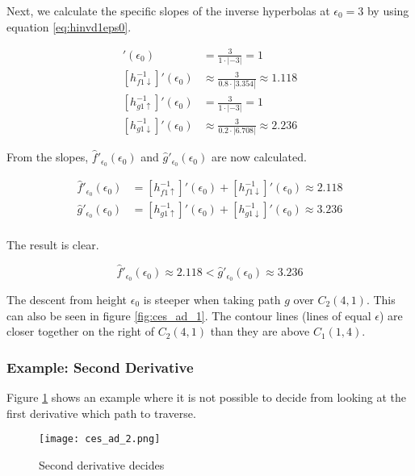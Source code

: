 Next, we calculate the specific slopes of the inverse hyperbolas at $\epsilon_0 = 3$ by using equation \ref{eq:hinvd1eps0}.

\begin{align*}
	[h_{f1\uparrow}^{-1}]'(\epsilon_0) &= \frac{3}{1\cdot\left|-3\right|} = 1\\
	[h_{f1\downarrow}^{-1}]'(\epsilon_0) &\approx \frac{3}{0.8\cdot\left|3.354\right|} \approx 1.118\\
	[h_{g1\uparrow}^{-1}]'(\epsilon_0) &= \frac{3}{1\cdot\left|-3\right|} = 1\\
	[h_{g1\downarrow}^{-1}]'(\epsilon_0) &\approx \frac{3}{0.2\cdot\left|6.708\right|} \approx 2.236 
\end{align*}

From the slopes, $\hat{f}'_{\epsilon_0}(\epsilon_0)$ and $\hat{g}'_{\epsilon_0}(\epsilon_0)$ are now calculated.

\begin{align*}
	\hat{f}'_{\epsilon_0}(\epsilon_0) &= [h_{f1\uparrow}^{-1}]'(\epsilon_0) + [h_{f1\downarrow}^{-1}]'(\epsilon_0) \approx 2.118\\
	\hat{g}'_{\epsilon_0}(\epsilon_0) &= [h_{g1\uparrow}^{-1}]'(\epsilon_0) + [h_{g1\downarrow}^{-1}]'(\epsilon_0) \approx 3.236\\
\end{align*}

The result is clear.

$$\hat{f}'_{\epsilon_0}(\epsilon_0) \approx 2.118 < \hat{g}'_{\epsilon_0}(\epsilon_0) \approx 3.236$$

The descent from height $\epsilon_0$ is steeper when taking path $g$ over $C_2(4, 1)$. This can also be seen in figure \ref{fig:ces_ad_1}. The contour lines (lines of equal $\epsilon$) are closer together on the right of $C_2(4, 1)$ than they are above $C_1(1, 4)$.


\subsubsection{Example: Second Derivative}

Figure \ref{fig:ces_ad_2} shows an example where it is not possible to decide from looking at the first derivative which path to traverse.

\begin{figure}[H]
	\centering
    
    \texttt{[image: ces\_ad\_2.png]}
		
	\caption{Second derivative decides\protect\footnotemark}
    \label{fig:ces_ad_2}
\end{figure}

